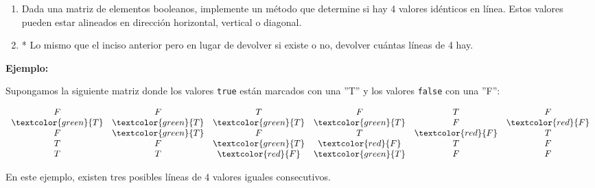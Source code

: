 \begin{enumerate}[label=\alph*)]
    \item Dada una matriz de elementos booleanos, implemente un método que determine si hay 4 valores idénticos en línea. Estos valores pueden estar alineados en dirección horizontal, vertical o diagonal.
    \item * Lo mismo que el inciso anterior pero en lugar de devolver si existe o no, devolver cuántas líneas de 4 hay.
\end{enumerate}


\textbf{Ejemplo:}

Supongamos la siguiente matriz donde los valores \texttt{true} están marcados con una ''T'' y los valores \texttt{false} con una ''F'':

\[
\begin{array}{cccccc}
F & F & T & F & T & F \\
\textcolor{green}{T} & \textcolor{green}{T}& \textcolor{green}{T} & \textcolor{green}{T} & F & \textcolor{red}{F} \\
F & \textcolor{green}{T} & F & T & \textcolor{red}{F} & T \\
T & F & \textcolor{green}{T} & \textcolor{red}{F} & T & F \\
T & T & \textcolor{red}{F} & \textcolor{green}{T} & F & F \\
\end{array}
\]

En este ejemplo, existen tres posibles líneas de 4 valores iguales consecutivos.
